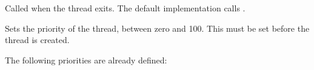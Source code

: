 \label{wxthreadonexit}


Called when the thread exits. The default implementation calls .

\label{wxthreadsetpriority}


Sets the priority of the thread, between zero and 100. This must be set before the thread is created.

The following priorities are already defined:

\twocolwidtha{7cm}
\begin{twocollist}\itemsep=0pt
\end{twocollist}
